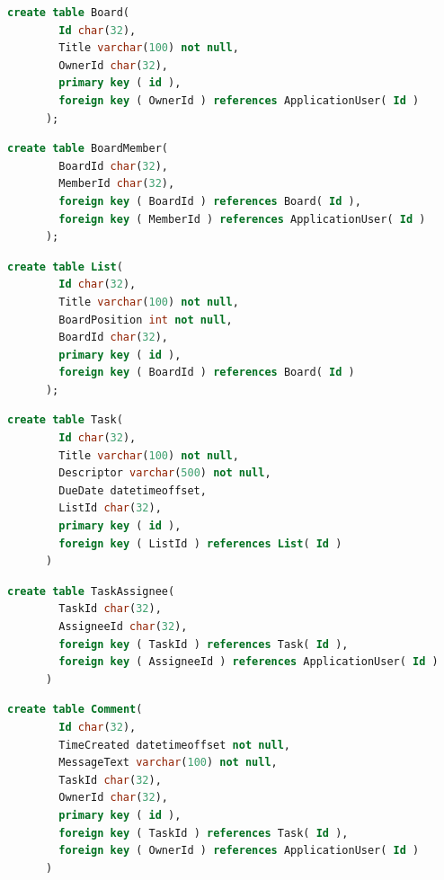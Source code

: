\documentclass[letterpaper]{article}
\begin{document}
    \begin{lstlisting}[language=SQL, caption=Board Table Creation Statement]
      create table Board(
        Id char(32),
        Title varchar(100) not null,
        OwnerId char(32),
        primary key ( id ),
        foreign key ( OwnerId ) references ApplicationUser( Id )
      );
    \end{lstlisting}

    \begin{lstlisting}[language=SQL, caption=BoardMember Table Creation Statement]
      create table BoardMember(
        BoardId char(32),
        MemberId char(32),
        foreign key ( BoardId ) references Board( Id ),
        foreign key ( MemberId ) references ApplicationUser( Id )
      );
    \end{lstlisting}
    \begin{lstlisting}[language=SQL, caption=List Table Creation Statement]
      create table List(
        Id char(32),
        Title varchar(100) not null,
        BoardPosition int not null,
        BoardId char(32),
        primary key ( id ),
        foreign key ( BoardId ) references Board( Id )
      );
    \end{lstlisting}
    \begin{lstlisting}[language=SQL, caption=Task Table Creation Statement]
      create table Task(
        Id char(32),
        Title varchar(100) not null,
        Descriptor varchar(500) not null,
        DueDate datetimeoffset,
        ListId char(32),
        primary key ( id ),
        foreign key ( ListId ) references List( Id )
      )
    \end{lstlisting}
    \begin{lstlisting}[language=SQL, caption=TaskAssignee Table Creation Statement]
      create table TaskAssignee(
        TaskId char(32),
        AssigneeId char(32),
        foreign key ( TaskId ) references Task( Id ),
        foreign key ( AssigneeId ) references ApplicationUser( Id )
      )
    \end{lstlisting}
    \begin{lstlisting}[language=SQL, caption=Comment Table Creation Statement]
      create table Comment(
        Id char(32),
        TimeCreated datetimeoffset not null,
        MessageText varchar(100) not null,
        TaskId char(32),
        OwnerId char(32),
        primary key ( id ),
        foreign key ( TaskId ) references Task( Id ),
        foreign key ( OwnerId ) references ApplicationUser( Id )
      )
    \end{lstlisting}
\end{document}
